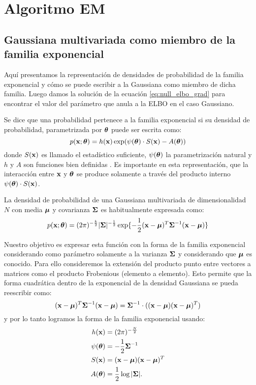 \chapter{Algoritmo EM}
\section{Gaussiana multivariada como miembro de la familia exponencial}\label{appendix:exp_family}

Aquí presentamos la representación de densidades de probabilidad de la familia exponencial y cómo se puede escribir a la Gaussiana como miembro de dicha familia. Luego damos la solución de la ecuación \ref{eq:null_elbo_grad} para encontrar el valor del parámetro que anula a la ELBO en el caso Gaussiano.

Se dice que una probabilidad pertenece a la familia exponencial si su densidad de probabilidad, parametrizada por $\mbox{\boldmath$ \theta $}$ puede ser escrita como:
$$p(\mathbf{x}; \mbox{\boldmath$ \theta $}) = h(\mathbf{x}) \exp(\psi(\mbox{\boldmath$ \theta $}) \cdot S(\mathbf{x}) - A(\mbox{\boldmath$ \theta $}))$$
donde $S(\mathbf{x})$ es llamado el estadístico suficiente, $\psi(\mbox{\boldmath$ \theta $})$ la parametrización natural y $h$ y $A$ son funciones bien definidas \citep{Wasserman2004}. Es importante en esta representación, que la interacción entre $\mathbf{x}$ y $\mbox{\boldmath$ \theta $}$ se produce solamente a través del producto interno $\psi(\mbox{\boldmath$ \theta $})\cdot S(\mathbf{x})$. 

La densidad de probabilidad de una Gaussiana multivariada de dimensionalidad $N$ con media $\mbox{\boldmath$ \mu $}$ y covarianza $\mbox{\boldmath$ \Sigma $}$ es habitualmente expresada como:
$$p(\mathbf{x}; \mbox{\boldmath$ \theta $}) = (2\pi)^{-\frac{k}{2}} |\mbox{\boldmath$ \Sigma $}|^{-\frac{1}{2}} \exp \{ - \frac{1}{2}(\mathbf{x}- \mbox{\boldmath$ \mu $})^T \mbox{\boldmath$ \Sigma $}^{-1}(\mathbf{x}-\mbox{\boldmath$ \mu $}) \}$$

Nuestro objetivo es expresar esta función con la forma de la familia exponencial considerando como parámetro solamente a la varianza $\mbox{\boldmath$ \Sigma $}$ y considerando que $\mbox{\boldmath$ \mu $}$ es conocido. Para ello consideremos la extensión del producto punto entre vectores a matrices como el producto Frobenious (elemento a elemento). Esto permite que la forma cuadrática dentro de la exponencial de la densidad Gaussiana se pueda reescribir como:
$$(\mathbf{x}- \mbox{\boldmath$ \mu $})^T \mbox{\boldmath$ \Sigma $}^{-1}(\mathbf{x}-\mbox{\boldmath$ \mu $}) = \mbox{\boldmath$ \Sigma $}^{-1} \cdot ((\mathbf{x}- \mbox{\boldmath$ \mu $}) (\mathbf{x}-\mbox{\boldmath$ \mu $})^T)$$
y por lo tanto logramos la forma de la familia exponencial usando:
\begin{align*}
    h(\mathbf{x}) &= (2\pi)^{-\frac{N}{2}} \\
    \psi(\mbox{\boldmath$ \theta $}) &=  -\frac{1}{2}\mbox{\boldmath$ \Sigma $}^{-1} \\ 
    S(\mathbf{x}) &= (\mathbf{x}- \mbox{\boldmath$ \mu $}) (\mathbf{x}-\mbox{\boldmath$ \mu $})^T \\
    A(\mbox{\boldmath$ \theta $}) &= \frac{1}{2} \log |\mbox{\boldmath$ \Sigma $}|.
\end{align*} 

